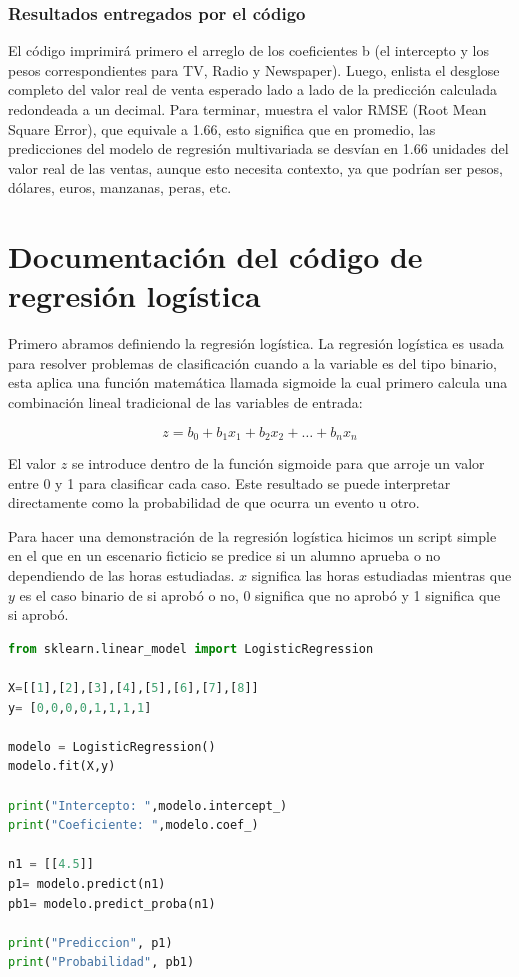 \documentclass[]{article}
\begin{document}
\subsubsection*{Resultados entregados por el código}
El código imprimirá primero el arreglo de los coeficientes b (el intercepto y los pesos correspondientes para TV, Radio y Newspaper). Luego, enlista el desglose completo del valor real de venta esperado lado a lado de la predicción calculada redondeada a un decimal. Para terminar, muestra el valor RMSE (Root Mean Square Error), que equivale a 1.66, esto significa que en promedio, las predicciones del modelo de regresión multivariada se desvían en 1.66 unidades del valor real de las ventas, aunque esto necesita contexto, ya que podrían ser pesos, dólares, euros, manzanas, peras, etc.


\section{Documentación del código de regresión logística}
\label{doc2}
Primero abramos definiendo la regresión logística. La regresión logística es usada para resolver problemas de clasificación cuando a la variable es del tipo binario, esta aplica una función matemática llamada sigmoide la cual primero calcula una combinación lineal tradicional de las variables de entrada:

\begin{equation*}
z = b_0 + b_1x_1 + b_2x_2 + \dots + b_nx_n
\end{equation*}

El valor $z$ se introduce dentro de la función sigmoide para que arroje un valor entre 0 y 1 para clasificar cada caso. Este resultado se puede interpretar directamente como la probabilidad de que ocurra un evento u otro.

Para hacer una demonstración de la regresión logística hicimos un script simple en el que en un escenario ficticio se predice si un alumno aprueba o no dependiendo de las horas estudiadas. $x$ significa las horas estudiadas mientras que $y$ es el caso binario de si aprobó o no, 0 significa que no aprobó y 1 significa que si aprobó.

\begin{lstlisting}[language=Python]
from sklearn.linear_model import LogisticRegression

X=[[1],[2],[3],[4],[5],[6],[7],[8]]
y= [0,0,0,0,1,1,1,1]

modelo = LogisticRegression()
modelo.fit(X,y)

print("Intercepto: ",modelo.intercept_)
print("Coeficiente: ",modelo.coef_)

n1 = [[4.5]]
p1= modelo.predict(n1)
pb1= modelo.predict_proba(n1)

print("Prediccion", p1)
print("Probabilidad", pb1)
\end{lstlisting}
\end{document}
